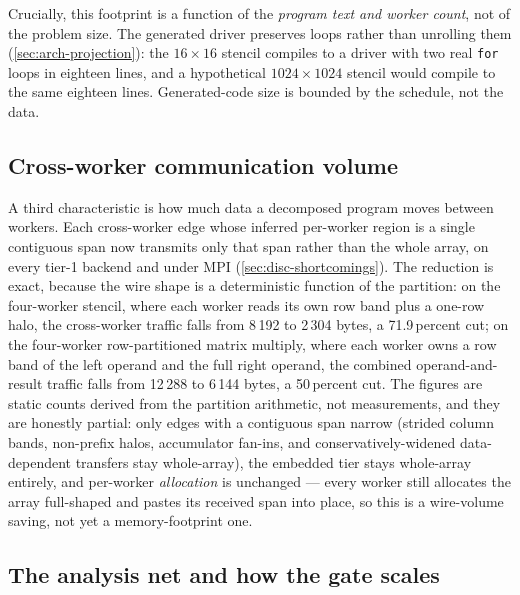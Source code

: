 Crucially, this footprint is a function of the \emph{program text and worker count},
not of the problem size. The generated driver preserves loops rather than unrolling
them (\cref{sec:arch-projection}): the $16\times16$ stencil compiles to a driver with
two real \texttt{for} loops in eighteen lines, and a hypothetical $1024\times1024$
stencil would compile to the same eighteen lines. Generated-code size is bounded by
the schedule, not the data.

\subsection{Cross-worker communication volume}\label{sec:res-quant-comm}

A third characteristic is how much data a decomposed program moves between workers.
Each cross-worker edge whose inferred per-worker region is a single contiguous span now
transmits only that span rather than the whole array, on every tier-1 backend and under
MPI (\cref{sec:disc-shortcomings}). The reduction is exact, because the wire shape is a
deterministic function of the partition: on the four-worker stencil, where each worker
reads its own row band plus a one-row halo, the cross-worker traffic falls from 8\,192 to
2\,304 bytes, a 71.9\,percent cut; on the four-worker row-partitioned matrix multiply,
where each worker owns a row band of the left operand and the full right operand, the
combined operand-and-result traffic falls from 12\,288 to 6\,144 bytes, a 50\,percent
cut. The figures are static counts derived from the partition arithmetic, not
measurements, and they are honestly partial: only edges with a contiguous span narrow
(strided column bands, non-prefix halos, accumulator fan-ins, and conservatively-widened
data-dependent transfers stay whole-array), the embedded tier stays whole-array
entirely, and per-worker \emph{allocation} is unchanged --- every worker still allocates
the array full-shaped and pastes its received span into place, so this is a wire-volume
saving, not yet a memory-footprint one.

\subsection{The analysis net and how the gate scales}\label{sec:res-quant-net}

